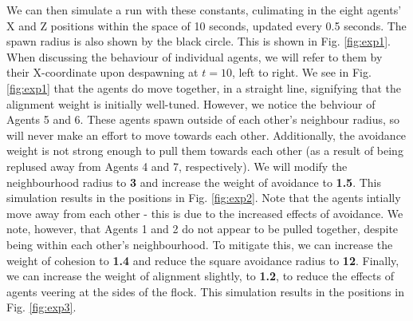 \documentclass{article}
\begin{document}
We can then simulate a run with these constants, culimating in the eight agents' X and Z positions within the space of 10 seconds, updated every 0.5 seconds. The spawn radius is also shown by the black circle. This is shown in Fig. \ref{fig:exp1}. When discussing the behaviour of individual agents, we will refer to them by their X-coordinate upon despawning at $t=10$, left to right. We see in Fig. \ref{fig:exp1} that the agents do move together, in a straight line, signifying that the alignment weight is initially well-tuned. However, we notice the behviour of Agents 5 and 6. These agents spawn outside of each other's neighbour radius, so will never make an effort to move towards each other. Additionally, the avoidance weight is not strong enough to pull them towards each other (as a result of being replused away from Agents 4 and 7, respectively). We will modify the neighbourhood radius to \textbf{3} and increase the weight of avoidance to \textbf{1.5}. This simulation results in the positions in Fig. \ref{fig:exp2}. Note that the agents intially move away from each other - this is due to the increased effects of avoidance. We note, however, that Agents 1 and 2 do not appear to be pulled together, despite being within each other's neighbourhood. To mitigate this, we can increase the weight of cohesion to \textbf{1.4} and reduce the square avoidance radius to \textbf{12}. Finally, we can increase the weight of alignment slightly, to \textbf{1.2}, to reduce the effects of agents veering at the sides of the flock. This simulation results in the positions in Fig. \ref{fig:exp3}.
\end{document}
